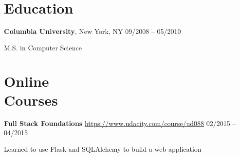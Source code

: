 \documentclass[margin,line]{resume}
\begin{document}
\begin{resume}
    \section{\myheadingstyle Education}

    \textbf{Columbia University}, New York, NY \hfill 09/2008 -- 05/2010 \vspace{-3mm}\\\vspace{-1mm}%
      \begin{list2}
       \item M.S. in Computer Science
      \end{list2}
    \vspace{-1mm}
 
    \section{\myheadingstyle Online \\ Courses}

    \textbf{Full Stack Foundations} \url{https://www.udacity.com/course/ud088} \hfill 02/2015 -- 04/2015 \vspace{-3mm}\\\vspace{-1mm}%
      \begin{list2}
       \item Learned to use Flask and SQLAlchemy to build a web application
      \end{list2}
    \vspace{-2mm}


\end{resume}
\end{document}
